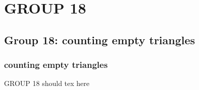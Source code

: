 
\section{GROUP 18}
\subsection{Group 18: counting empty triangles}
\begin{frame}
\frametitle{counting empty triangles}
GROUP 18 should tex here
\end{frame}
